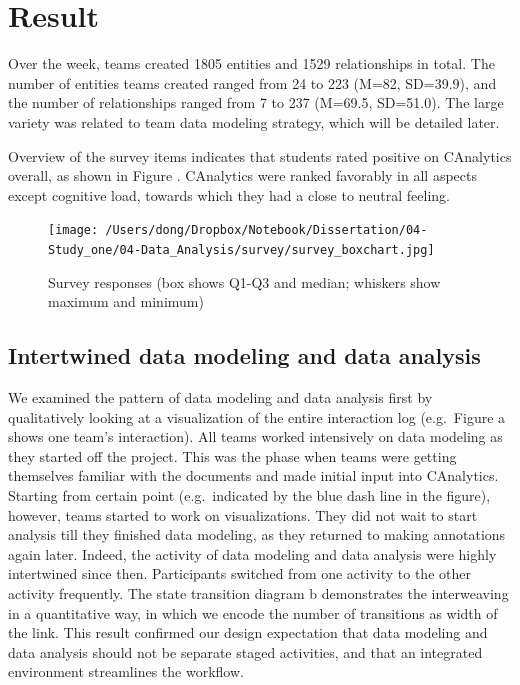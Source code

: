 
\section{Result}\label{result}

Over the week, teams created 1805 entities and 1529 relationships in
total. The number of entities teams created ranged from 24 to 223 (M=82,
SD=39.9), and the number of relationships ranged from 7 to 237 (M=69.5,
SD=51.0). The large variety was related to team data modeling strategy,
which will be detailed later.

Overview of the survey items indicates that students rated positive on
CAnalytics overall, as shown in Figure \autocite{fig:survey}. CAnalytics
were ranked favorably in all aspects except cognitive load, towards
which they had a close to neutral feeling.

\begin{figure}
\centering
\texttt{[image: /Users/dong/Dropbox/Notebook/Dissertation/04-Study\_one/04-Data\_Analysis/survey/survey\_boxchart.jpg]}
\caption{Survey responses (box shows Q1-Q3 and median; whiskers show
maximum and minimum)\label{fig:survey}}
\end{figure}

\subsection{Intertwined data modeling and data
analysis}\label{intertwined-data-modeling-and-data-analysis}

We examined the pattern of data modeling and data analysis first by
qualitatively looking at a visualization of the entire interaction log
(e.g.~Figure \autocite{fig:intertwined}a shows one team's interaction). All
teams worked intensively on data modeling as they started off the
project. This was the phase when teams were getting themselves familiar
with the documents and made initial input into CAnalytics. Starting from
certain point (e.g.~indicated by the blue dash line in the figure),
however, teams started to work on visualizations. They did not wait to
start analysis till they finished data modeling, as they returned to
making annotations again later. Indeed, the activity of data modeling
and data analysis were highly intertwined since then. Participants
switched from one activity to the other activity frequently. The state
transition diagram \autocite{fig:intertwined}b demonstrates the
interweaving in a quantitative way, in which we encode the number of
transitions as width of the link. This result confirmed our design
expectation that data modeling and data analysis should not be separate
staged activities, and that an integrated environment streamlines the
workflow.

